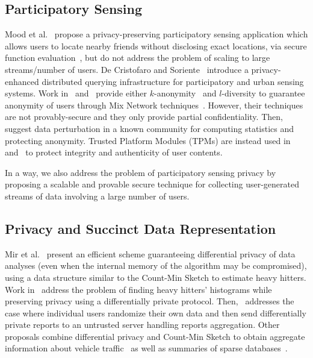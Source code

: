 \documentclass[conference]{IEEEtran}
\begin{document}
\subsection{Participatory Sensing}
Mood et al.~\cite{mood2014reuse} propose a privacy-preserving participatory sensing application which allows users to locate nearby friends without disclosing exact locations, via secure function evaluation~\cite{yao1982protocols}, but do not address the problem of scaling to large streams/number of users. De Cristofaro and Soriente~\cite{de2013extended} introduce a privacy-enhanced distributed querying infrastructure for participatory and urban sensing systems.
Work in~\cite{mobisys08} and~\cite{comcom} provide either $k$-anonymity~\cite{k-anonymity} and $l$-diversity \cite{l-diversity} to guarantee anonymity of users through Mix Network techniques~\cite{MixNet}. However, their techniques are not provably-secure and they only provide partial confidentiality.
Then,~\cite{ganti2008} suggest data perturbation in a known community for computing statistics and protecting anonymity.
Trusted Platform Modules (TPMs) are instead used in~\cite{gilbert2010} and~\cite{dua2009} to protect integrity and authenticity of user contents.

In a way, we also address the problem of participatory sensing privacy by proposing a scalable and provable secure technique for collecting user-generated streams of data involving a large number of users.


\subsection{Privacy and Succinct Data Representation}
Mir et al.~\cite{mir2011pan} present an efficient scheme guaranteeing differential privacy of data analyses (even when the internal memory of the algorithm may be compromised), using a data structure similar to the Count-Min Sketch to estimate heavy hitters. 
Work in~\cite{hsu2012distributed, chan2012differentially} address the problem of finding heavy hitters' histograms while preserving privacy using 
a differentially private protocol. 
Then,~\cite{bassilylocal} addresses the case where individual users randomize their own data and then send differentially private reports to an untrusted server handling reports aggregation.  
Other proposals combine differential privacy and Count-Min Sketch to obtain aggregate information about vehicle traffic~\cite{Monreale2013} as well as summaries of sparse databases~\cite{cormode2012differentially}.
\end{document}
